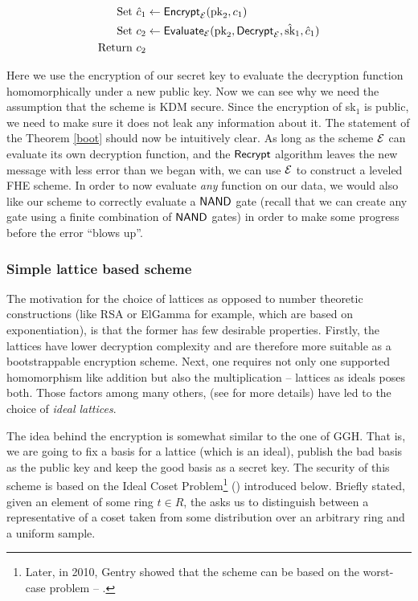 \begin{align*}
	\text{Set } \hat{c}_1 & \leftarrow \textsf{Encrypt}_{\mathcal{E}} (\text{pk}_2, c_1) \\
	\text{Set } c_2 & \leftarrow \textsf{Evaluate}_{\mathcal{E}} (\text{pk}_2, \textsf{Decrypt}_{\mathcal{E}}, \hat{\text{sk}}_1, \hat{c}_1) \\
	\text{Return } c_2 &
\end{align*}

Here we use the encryption of our secret key to evaluate the decryption function homomorphically under a new public key. Now we can see why we need the assumption that the scheme is KDM secure. Since the encryption of sk$_1$ is public, we need to make sure it does not leak any information about it. The statement of the Theorem \ref{boot} should now be intuitively clear. As long as the scheme $\mathcal{E}$ can evaluate its own decryption function, and the $\textsf{Recrypt}$ algorithm leaves the new message with less error than we began with, we can use $\mathcal{E}$ to construct a leveled FHE scheme. In order to now evaluate \textit{any} function on our data, we would also like our scheme to correctly evaluate a $\textsf{NAND}$ gate (recall that we can create any gate using a finite combination of $\textsf{NAND}$ gates) in order to make some progress before the error ``blows up''.

\subsubsection{Simple lattice based scheme}
The motivation for the choice of lattices as opposed to number theoretic constructions (like RSA or ElGamma for example, which are based on exponentiation), is that the former has few desirable properties. Firstly, the lattices have lower decryption complexity and are therefore more suitable as a bootstrappable encryption scheme. Next, one requires not only one supported homomorphism like addition but also the multiplication -- lattices as ideals poses both. Those factors among many others, (see \cite{gentry} for more details) have led to the choice of \textit{ideal lattices}.

The idea behind the encryption is somewhat similar to the one of GGH. That is, we are going to fix a basis for a lattice (which is an ideal), publish the bad basis as the public key and keep the good basis as a secret key. The security of this scheme is based on the Ideal Coset Problem\footnote{Later, in 2010, Gentry showed that the scheme can be based on the worst-case  problem -- \cite{worst-case}.} () introduced below. Briefly stated, given an element of some ring $t \in R$, the  asks us to distinguish between a representative of a coset taken from some distribution over an arbitrary ring and a uniform sample.

